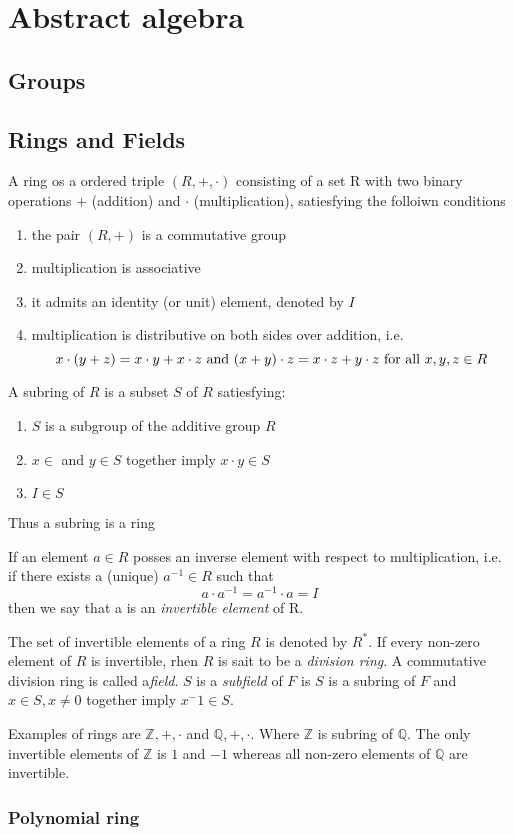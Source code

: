 \chapter{Abstract algebra}

\section{Groups}


\section{Rings and Fields}
A ring os a ordered triple $(R, +, \cdot)$ consisting of a set R with two
binary operations $+$ (addition) and $\cdot$ (multiplication), satiesfying the
folloiwn conditions

\begin{enumerate}
\item the pair $(R, +)$ is a commutative group
\item multiplication is associative
\item it admits an identity (or unit) element, denoted by $I$
\item multiplication is distributive on both sides over addition, i.e.
\[
x \cdot (y + z) = x \cdot y + x \cdot z
\textnormal{ and }
(x+y) \cdot z = x \cdot z + y \cdot z
\textnormal{ for all } x,y,z \in R
\]
\end{enumerate}

\noindent A subring of $R$ is a subset $S$ of $R$ satiesfying:
\begin{enumerate}
\item $S$ is a subgroup of the additive group $R$
\item $x \in $ and $y \in S$ together imply $x \cdot y \in S$
\item $I \in S$
\end{enumerate}
Thus a subring is a ring

If an element $a \in R$ posses an inverse element with respect to
multiplication, i.e. if there exists a (unique) $a^{-1} \in R$ such that
\[
a \cdot a^{-1} = a^{-1} \cdot a = I
\]
then we say that a is an \textit{invertible element} of R.

The set of invertible elements of a ring $R$ is denoted by $R^*$. If every
non-zero element of $R$ is invertible, rhen $R$ is sait to be a
\textit{division ring}. A commutative division ring is called a\textit{field}.
$S$ is a \textit{subfield} of $F$ is $S$ is a subring of $F$ and
$x \in S, x \neq 0$ together imply $x^-1 \in S$.

Examples of rings are $\mathbb{Z}, +, \cdot$ and $\mathbb{Q}, +, \cdot$. Where
$\mathbb{Z}$ is subring of $\mathbb{Q}$. The only invertible elements of
$\mathbb{Z}$ is $1$ and $-1$ whereas all non-zero elements of $\mathbb{Q}$ are
invertible.

\subsection{Polynomial ring}

